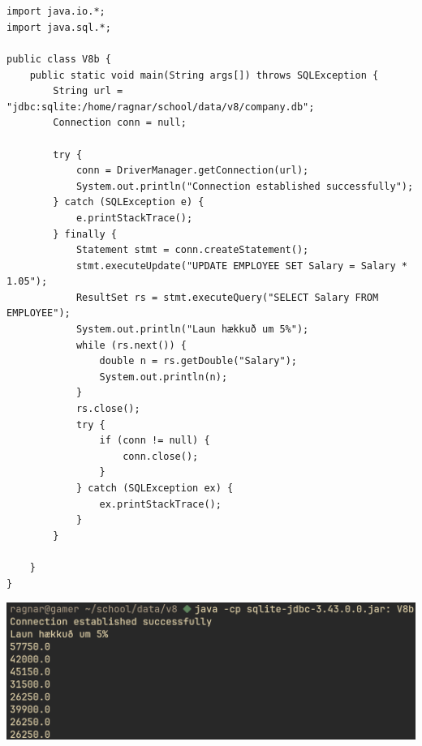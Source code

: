\documentclass{article}
\begin{document}
	\section{}
	\begin{verbatim}
import java.io.*;
import java.sql.*;

public class V8b {
	public static void main(String args[]) throws SQLException {
		String url = "jdbc:sqlite:/home/ragnar/school/data/v8/company.db";
		Connection conn = null;

		try {
			conn = DriverManager.getConnection(url);
			System.out.println("Connection established successfully");
		} catch (SQLException e) {
			e.printStackTrace();
		} finally {
			Statement stmt = conn.createStatement();
			stmt.executeUpdate("UPDATE EMPLOYEE SET Salary = Salary * 1.05");
			ResultSet rs = stmt.executeQuery("SELECT Salary FROM EMPLOYEE");
			System.out.println("Laun hækkuð um 5%");
			while (rs.next()) {
				double n = rs.getDouble("Salary");
				System.out.println(n);
			}
			rs.close();
			try {
				if (conn != null) {
					conn.close();
				}
			} catch (SQLException ex) {
				ex.printStackTrace();
			}
		}

	}
}
	\end{verbatim}
	\begin{center}
		\includegraphics[scale=0.33]{b.png}
	\end{center}

	\newpage
\end{document}
